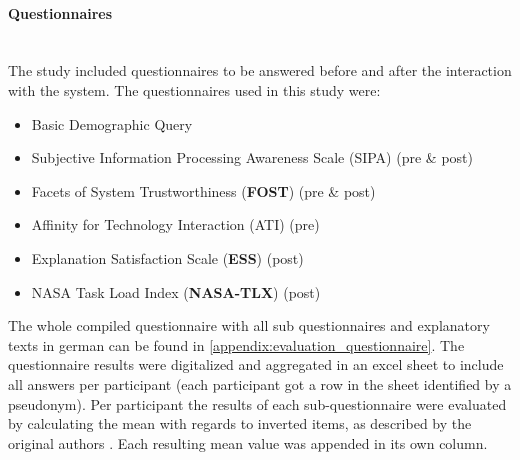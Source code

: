 \documentclass[11pt,a4paper,english]{scrreprt}
\begin{document}
\paragraph{Questionnaires}\mbox{} \\
The study included questionnaires to be answered before and after the interaction with the system. The questionnaires used in this study were:
\begin{itemize}
    \item Basic Demographic Query
    \item Subjective Information Processing Awareness Scale (SIPA) \parencite{schrills_sipas_2021} (pre \& post)
    \item Facets of System Trustworthiness (\textbf{FOST}) \parencite{franke_advancing_2015} (pre \& post)
    \item Affinity for Technology Interaction (ATI) \parencite{franke_personal_2019} (pre)
    \item Explanation Satisfaction Scale (\textbf{ESS}) \parencite{hoffman_metrics_2019} (post)
    \item NASA Task Load Index (\textbf{NASA-TLX}) \parencite{hart_nasa-task_2006} (post)
\end{itemize}
The whole compiled questionnaire with all sub questionnaires and explanatory texts in german can be found in \autoref{appendix:evaluation_questionnaire}. The questionnaire results were digitalized and aggregated in an excel sheet to include all answers per participant (each participant got a row in the sheet identified by a pseudonym). Per participant the results  of each sub-questionnaire were evaluated by calculating the mean with regards to inverted items, as described by the original authors \parencite{schrills_sipas_2021,franke_personal_2019,franke_advancing_2015,hoffman_metrics_2019,hart_nasa-task_2006}. Each resulting mean value was appended in its own column.
\end{document}
